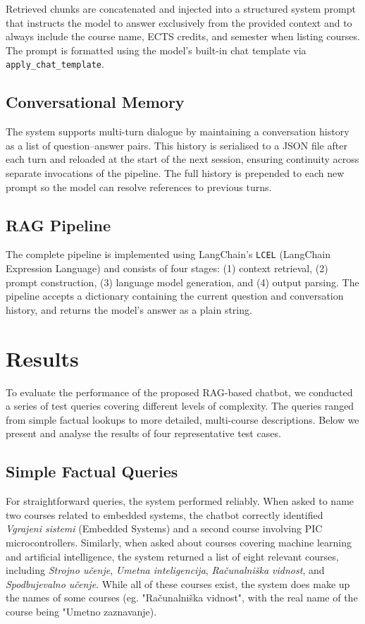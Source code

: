 \documentclass[fleqn,moreauthors,10pt]{ds_report}
\begin{document}
Retrieved chunks are concatenated and injected into a structured system prompt that instructs the model to answer exclusively from the provided context and to always include the course name, ECTS credits, and semester when listing courses. The prompt is formatted using the model's built-in chat template via \texttt{apply\_chat\_template}.

\subsection*{Conversational Memory}

The system supports multi-turn dialogue by maintaining a conversation history as a list of question–answer pairs. This history is serialised to a JSON file after each turn and reloaded at the start of the next session, ensuring continuity across separate invocations of the pipeline. The full history is prepended to each new prompt so the model can resolve references to previous turns.

\subsection*{RAG Pipeline}

The complete pipeline is implemented using LangChain's \texttt{LCEL} (LangChain Expression Language) and consists of four stages: (1) context retrieval, (2) prompt construction, (3) language model generation, and (4) output parsing. The pipeline accepts a dictionary containing the current question and conversation history, and returns the model's answer as a plain string.


\section*{Results}

To evaluate the performance of the proposed RAG-based chatbot, we conducted a series of test queries covering different levels of complexity. The queries ranged from simple factual lookups to more detailed, multi-course descriptions. Below we present and analyse the results of four representative test cases.

\subsection*{Simple Factual Queries}

For straightforward queries, the system performed reliably. When asked to name two courses related to embedded systems, the chatbot correctly identified \textit{Vgrajeni sistemi} (Embedded Systems) and a second course involving PIC microcontrollers. Similarly, when asked about courses covering machine learning and artificial intelligence, the system returned a list of eight relevant courses, including \textit{Strojno učenje}, \textit{Umetna inteligencija}, \textit{Računalniška vidnost}, and \textit{Spodbujevalno učenje}. While all of these courses exist, the system does make up the names of some courses (eg. "Računalniška vidnost", with the real name of the course being "Umetno zaznavanje).
\end{document}
